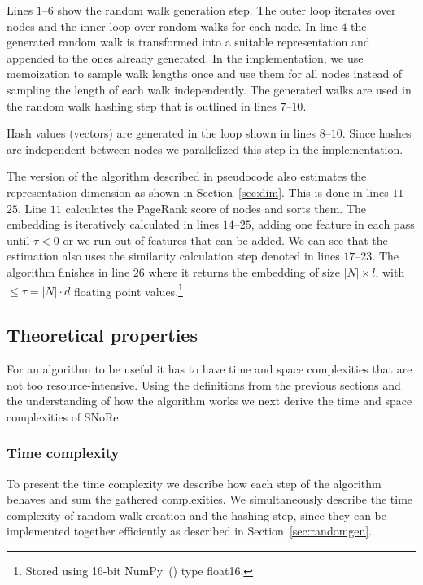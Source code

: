 \documentclass[twoside,11pt]{article}
\begin{document}
Lines $1$--$6$ show the random walk generation step. The outer loop iterates over nodes and the inner loop over random walks for each node. In line $4$ the generated random walk is transformed into a suitable representation and appended to the ones already generated. In the implementation, we use memoization to sample walk lengths once and use them for all nodes instead of sampling the length of each walk independently. The generated $\textrm{walks}$ are used in the random walk hashing step that is outlined in lines $7$--$10$.

Hash values (vectors) are generated in the loop shown in lines $8$--$10$. Since hashes are independent between nodes we parallelized this step in the implementation.

The version of the algorithm described in pseudocode also estimates the representation dimension as shown in Section~\ref{sec:dim}. This is done in lines $11$--$25$. Line $11$ calculates the PageRank score of nodes and sorts them. The embedding is iteratively calculated in lines $14$--$25$, adding one feature in each pass until $\tau < 0$ or we run out of features that can be added. We can see that the estimation also uses the similarity calculation step denoted in lines $17$--$23$.
The algorithm finishes in line $26$ where it returns the embedding of size $|N| \times l$, with $\leq \tau = |N| \cdot d$ floating point values.\footnote{Stored using 16-bit NumPy~(\cite{van2011numpy,oliphant2006guide}) type float16.}

\subsection{Theoretical properties}
\label{sec:properties}
For an algorithm to be useful it has to have time and space complexities that are not too resource-intensive. Using the definitions from the previous sections and the understanding of how the algorithm works we next derive the time and space complexities of SNoRe.

\subsubsection{Time complexity}
\label{sec:prop-time}
To present the time complexity we describe how each step of the algorithm behaves and sum the gathered complexities. We simultaneously describe the time complexity of random walk creation and the hashing step, since they can be implemented together efficiently as described in Section~\ref{sec:randomgen}. 
\end{document}
